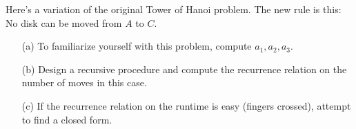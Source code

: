 Here's a variation of the original Tower of Hanoi problem. 
The new rule is this: 
No disk can be moved from $A$ to $C$.
\begin{enumerate}[nosep]
\item[(a)]
To familiarize yourself with this problem, compute $a_1, a_2, a_3$.
\item[(b)]
Design a recursive procedure and compute the 
recurrence relation on the number of moves in this case.
\item[(c)] If the recurrence relation on the runtime is easy (fingers
crossed), attempt to find a closed form.
\end{enumerate}
